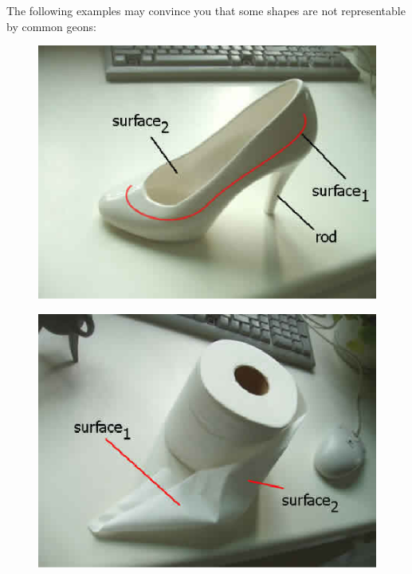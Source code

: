 The following examples may convince you that some shapes are not representable by common geons:

\begin{figure}[H]
\centering
\includegraphics[scale=0.7,bb=0 0 448 336]{HighHeelAnalysis.eps}
\end{figure}

\begin{figure}[H]
\centering
\includegraphics[scale=0.7,bb=0 0 448 336]{ToiletRollAnalysis.eps}
\end{figure}

